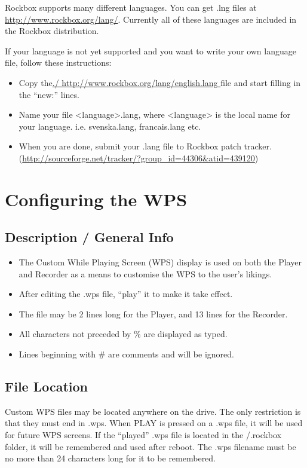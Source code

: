 Rockbox supports many different languages. You can get .lng files at
\url{http://www.rockbox.org/lang/}. 
Currently all of these languages are included in the Rockbox
distribution.

If your language is not yet supported and you want to write your own
language file,  follow these instructions:

\begin{itemize}
\item Copy the\url{./ http://www.rockbox.org/lang/english.lang }file and start filling in the ``new:'' lines. 
\item Name your file {\textless}language{\textgreater}.lang, where
{\textless}language{\textgreater} is the local name for your language. i.e. svenska.lang, francais.lang etc. 
\item When you are done, submit your .lang file to Rockbox patch
tracker.
(\url{http://sourceforge.net/tracker/?group_id=44306&atid=439120})
\end{itemize}

\section{\label{ref:ConfiguringtheWPS}Configuring the WPS}

\subsection{Description / General Info}

\begin{itemize}
\item The Custom While Playing Screen (WPS) display is used on both the
Player and Recorder as a means to customise the WPS to the
user's likings.
\item After editing the .wps file, ``play'' it to make it take effect.
\item The file may be 2 lines long for the Player, and 13 lines for the
Recorder.
\item All characters not preceded by \% are displayed as typed.
\item Lines beginning with \# are comments and will be ignored.
\end{itemize}

\subsection{File Location}
Custom WPS files may be located anywhere on the drive. The only
restriction is that they must end in .wps. When PLAY is pressed on a
.wps file, it will be used for future WPS screens. If the
``played'' .wps file is located in the
/.rockbox folder, it will be remembered and used after reboot. The .wps
filename must be no more than 24 characters long for it to be
remembered.

